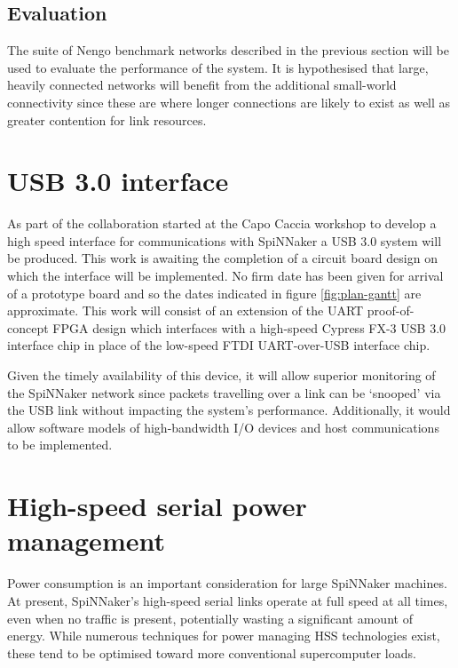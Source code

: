 		\subsection{Evaluation}
			
			The suite of Nengo benchmark networks described in the previous section
			will be used to evaluate the performance of the system. It is hypothesised
			that large, heavily connected networks will benefit from the additional
			small-world connectivity since these are where longer connections are
			likely to exist as well as greater contention for link resources.
	
	
	\section{USB 3.0 interface}
		
		As part of the collaboration started at the Capo Caccia workshop to develop
		a high speed interface for communications with SpiNNaker a USB 3.0 system
		will be produced. This work is awaiting the completion of a circuit board
		design on which the interface will be implemented. No firm date has been
		given for arrival of a prototype board and so the dates indicated in figure
		\ref{fig:plan-gantt} are approximate. This work will consist of an extension
		of the UART proof-of-concept FPGA design which interfaces with a high-speed
		Cypress FX-3 USB 3.0 interface chip in place of the low-speed FTDI
		UART-over-USB interface chip.
		
		Given the timely availability of this device, it will allow superior
		monitoring of the SpiNNaker network since packets travelling over a link can
		be `snooped' via the USB link without impacting the system's performance.
		Additionally, it would allow software models of high-bandwidth I/O devices
		and host communications to be implemented.
	
	
	\section{High-speed serial power management}
		
		
		Power consumption is an important consideration for large SpiNNaker
		machines. At present, SpiNNaker's high-speed serial links operate at full
		speed at all times, even when no traffic is present, potentially wasting a
		significant amount of energy. While numerous techniques for power managing
		HSS technologies exist, these tend to be optimised toward more conventional
		supercomputer loads.
		
